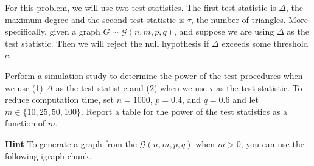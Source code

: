 \documentclass[
]{article}
\begin{document}
For this problem, we will use two test statistics. The first test
statistic is \(\Delta\), the maximum degree and the second test
statistic is \(\tau\), the number of triangles. More specifically, given
a graph \(G \sim \mathcal{G}(n,m,p,q)\), and suppose we are using
\(\Delta\) as the test statistic. Then we will reject the null
hypothesis if \(\Delta\) exceeds some threshold \(c\).

Perform a simulation study to determine the power of the test procedures
when we use (1) \(\Delta\) as the test statistic and (2) when we use
\(\tau\) as the test statistic. To reduce computation time, set
\(n = 1000\), \(p = 0.4\), and \(q = 0.6\) and let
\(m \in \{10,25,50,100\}\). Report a table for the power of the test
statistics as a function of \(m\).

\textbf{Hint} To generate a graph from the \(\mathcal{G}(n,m,p,q)\) when
\(m > 0\), you can use the following igraph chunk.
\end{document}
